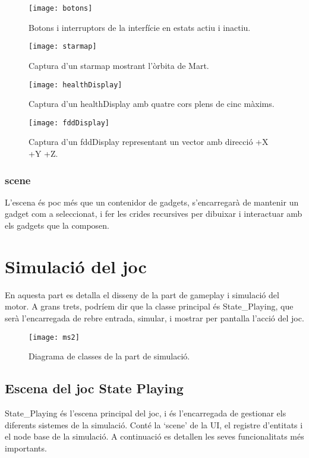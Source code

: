 \begin{figure}[H]
  \centering
  \texttt{[image: botons]}
  \caption{Botons i interruptors de la interfície en estats actiu i inactiu.}
\end{figure}
\begin{figure}[H]
  \centering
  \texttt{[image: starmap]}
  \caption{Captura d'un starmap mostrant l'òrbita de Mart.}
\end{figure}
\begin{figure}[H]
  \centering
  \texttt{[image: healthDisplay]}
  \caption{Captura d'un healthDisplay amb quatre cors plens de cinc màxims.}
\end{figure}
\begin{figure}[H]
  \centering
  \texttt{[image: fddDisplay]}
  \caption{Captura d'un fddDisplay representant un vector amb direcció +X +Y +Z.}
\end{figure}

\subsubsection{scene}
L'escena és poc més que un contenidor de gadgets, s'encarregarà de mantenir un gadget com a seleccionat, i fer les crides recursives per dibuixar i interactuar amb els gadgets que la composen.

\section{Simulació del joc}
En aquesta part es detalla el disseny de la part de gameplay i simulació del motor. A grans trets, podríem dir que la classe principal és State\_Playing, que serà l'encarregada de rebre entrada, simular, i mostrar per pantalla l'acció del joc.
\begin{figure}[H]
  \centering
  \texttt{[image: ms2]}
  \caption{Diagrama de classes de la part de simulació.}
\end{figure}

\subsection{Escena del joc State Playing}
State\_Playing és l'escena principal del joc, i és l'encarregada de gestionar els diferents sistemes de la simulació. Conté la `scene' de la UI, el registre d'entitats i el node base de la simulació. A continuació es detallen les seves funcionalitats més importants.
